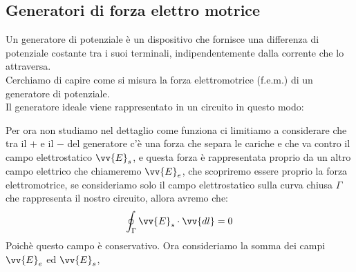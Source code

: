 \documentclass[a4paper, oneside]{article}
\begin{document}
\subsection{Generatori di forza elettro motrice}
Un generatore di potenziale è un dispositivo che fornisce una differenza di potenziale costante tra i suoi terminali, indipendentemente dalla corrente che lo attraversa.\\
Cerchiamo di capire come si misura la forza elettromotrice (f.e.m.) di un generatore di potenziale.\\
Il generatore ideale viene rappresentato in un circuito in questo modo:
\begin{center}
\end{center}
    Per ora non studiamo nel dettaglio come funziona ci limitiamo a considerare che tra il $+$ e il $-$ del generatore c'è una forza che separa le cariche e che va contro il campo elettrostatico $\vv{E}_s$, e questa forza è rappresentata proprio da un altro campo elettrico che chiameremo $\vv{E}_e$, che scopriremo essere proprio la forza elettromotrice, se consideriamo solo il campo elettrostatico sulla curva chiusa $\Gamma$ che rappresenta il nostro circuito, allora avremo che:
    \begin{gather*}
        \oint_\Gamma \vv{E}_s \cdot \vv{dl} =  0
    \end{gather*}
    Poichè questo campo è conservativo. Ora consideriamo la somma dei campi $\vv{E}_e$ ed $\vv{E}_s$, 
    \par
    \begin{figure}
    \end{figure}\noindent
\end{document}
